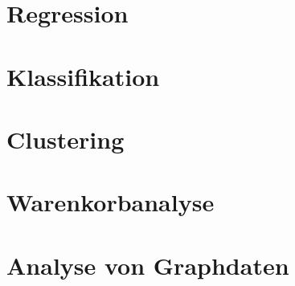 \documentclass{scrartcl}
\begin{document}
\section{Regression}

\section{Klassifikation}

\section{Clustering}

\section{Warenkorbanalyse}

\section{Analyse von Graphdaten}
\end{document}
